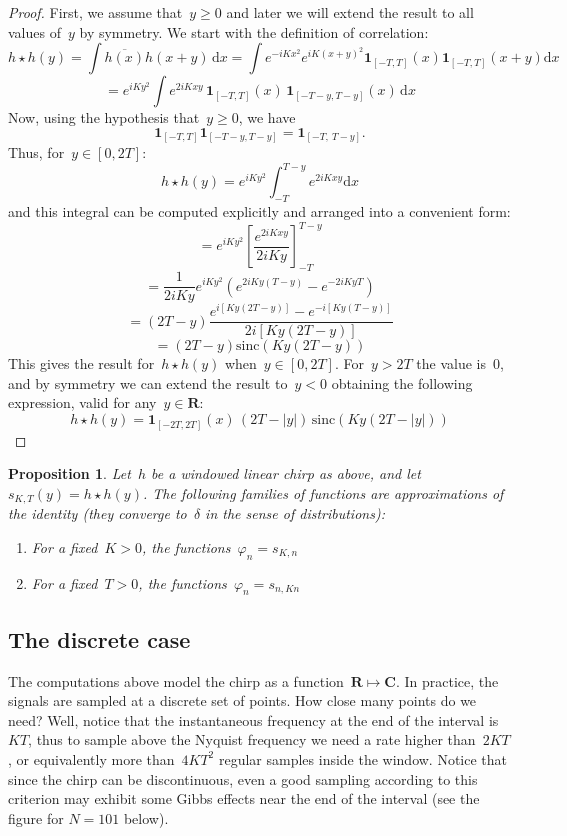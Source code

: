 \documentclass[a4paper]{article}           %
\newtheorem{proposition}[theorem]{Proposition}
\newcommand{\1}{\mathbf{1}}
\newcommand{\R}{\mathbf{R}}
\newcommand{\C}{\mathbf{C}}
\newcommand{\ud}{\mathrm{d}}
\newcommand{\abs}[1]{\left|#1\right|}
\newcommand{\paren}[1]{\left(#1\right)}
\begin{document}
\begin{proof}
	First, we assume that~$y\ge0$ and later we will extend the result to all
	values of~$y$ by symmetry.  We start with the definition of correlation:
	\[
		h\star h (y)
		=
		\int
		\overline{h(x)}h(x+y)\,\ud x
		=
		\int
		e^{-iKx^2}
		e^{iK\paren{x+y}^2}
		\1_{[-T,T]} (x)
		\1_{[-T,T]} (x+y)
		\ud x
	\]
	\[
		=
		e^{iKy^2}
		\int
		e^{2iKxy}
		\,
		\1_{[-T,T]} (x)
		\,
		\1_{[-T-y,T-y]} (x)
		\,
		\ud x
	\]
	Now, using the hypothesis that~$y\ge0$, we have
	\[
		\1_{[-T,T]} \1_{[-T-y,T-y]}
		=
		\1_{[-T,\ T-y]}.
	\]
	Thus, for~$y\in[0,2T]$:
	\[
		h\star h (y)
		=
		e^{iKy^2}
		\int_{-T}^{T-y}
		e^{2iKxy}
		\ud x
	\]
	and this integral can be computed explicitly and arranged into a convenient
	form:
	\[
		=
		e^{iKy^2}
		\left[
			\frac{\displaystyle e^{2iKxy}}{2iKy}
		\right]_{-T}^{T-y}
	\]
	\[
		=
		\frac{1}{2iKy}
		e^{iKy^2}
		\paren{
			e^{2iKy(T-y)}
			-
			e^{-2iKyT}
		}
	\]
	\[
		=
		\paren{2T-y}
		\frac{
			e^{i\left[Ky\paren{2T-y}\right]}-e^{-i\left[Ky\paren{T-y}\right]}
			}{
				2i\left[Ky\paren{2T-y}\right]
		}
	\]
	\[
		=
		\paren{2T-y}\mathrm{sinc}\paren{Ky\paren{2T-y}}
	\]
	This gives the result for~$h\star h(y)$ when~$y\in[0,2T]$.  For~$y>2T$ the
	value is~$0$, and by symmetry we can extend the result to~$y<0$ obtaining
	the following expression, valid for any~$y\in\R$:
	\[
		h\star h(y)=\1_{[-2T,2T]}(x)\,\paren{2T-\abs{y}}
		\,
		\mathrm{sinc}\paren{ Ky\paren{2T-\abs{y}} }
	\]
\end{proof}

\begin{proposition}
	Let~$h$ be a windowed linear chirp as above, and let~$s_{K,T}(y)=h\star
	h(y)$.  The following families of functions are approximations of the
	identity (they converge to~$\delta$ in the sense of distributions):
	\begin{enumerate}
		\item For a fixed~$K>0$, the functions~$\varphi_n=s_{K,n}$
		\item For a fixed~$T>0$, the functions~$\varphi_n=s_{n,Kn}$
	\end{enumerate}
\end{proposition}

\subsection{The discrete case}

The computations above model the chirp as a function~$\R\mapsto\C$.  In
practice, the signals are sampled at a discrete set of points.  How close
many points do we need?  Well, notice that the instantaneous frequency at the
end of the interval is~$KT$, thus to sample above the Nyquist frequency we
need a rate higher than~$2KT$, or equivalently more than~$4KT^2$ regular
samples inside the window.  Notice that since the chirp can be discontinuous,
even a good sampling according to this criterion may exhibit some Gibbs
effects near the end of the interval (see the figure for $N=101$ below).
\end{document}
